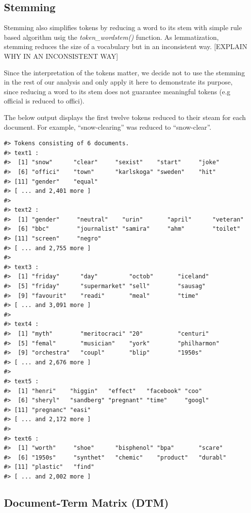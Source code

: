 \documentclass[
]{article}
\begin{document}
\hypertarget{stemming}{%
\subsection{Stemming}\label{stemming}}

Stemming also simplifies tokens by reducing a word to its stem with
simple rule based algorithm usig the \emph{token\_wordstem()} function.
As lemmatization, stemming reduces the size of a vocabulary but in an
inconsistent way. {[}EXPLAIN WHY IN AN INCONSISTENT WAY{]}

Since the interpretation of the tokens matter, we decide not to use the
stemming in the rest of our analysis and only apply it here to
demonstrate its purpose, since reducing a word to its stem does not
guarantee meaningful tokens (e.g official is reduced to offici).

The below output displays the first twelve tokens reduced to their steam
for each document. For example, ``snow-clearing'' was reduced to
``snow-clear''.

\begin{verbatim}
#> Tokens consisting of 6 documents.
#> text1 :
#>  [1] "snow"      "clear"     "sexist"    "start"     "joke"     
#>  [6] "offici"    "town"      "karlskoga" "sweden"    "hit"      
#> [11] "gender"    "equal"    
#> [ ... and 2,401 more ]
#> 
#> text2 :
#>  [1] "gender"     "neutral"    "urin"       "april"      "veteran"   
#>  [6] "bbc"        "journalist" "samira"     "ahm"        "toilet"    
#> [11] "screen"     "negro"     
#> [ ... and 2,755 more ]
#> 
#> text3 :
#>  [1] "friday"      "day"         "octob"       "iceland"    
#>  [5] "friday"      "supermarket" "sell"        "sausag"     
#>  [9] "favourit"    "readi"       "meal"        "time"       
#> [ ... and 3,091 more ]
#> 
#> text4 :
#>  [1] "myth"        "meritocraci" "20"          "centuri"    
#>  [5] "femal"       "musician"    "york"        "philharmon" 
#>  [9] "orchestra"   "coupl"       "blip"        "1950s"      
#> [ ... and 2,676 more ]
#> 
#> text5 :
#>  [1] "henri"    "higgin"   "effect"   "facebook" "coo"     
#>  [6] "sheryl"   "sandberg" "pregnant" "time"     "googl"   
#> [11] "pregnanc" "easi"    
#> [ ... and 2,172 more ]
#> 
#> text6 :
#>  [1] "worth"     "shoe"      "bisphenol" "bpa"       "scare"    
#>  [6] "1950s"     "synthet"   "chemic"    "product"   "durabl"   
#> [11] "plastic"   "find"     
#> [ ... and 2,002 more ]
\end{verbatim}

\hypertarget{document-term-matrix-dtm}{%
\subsection{Document-Term Matrix (DTM)}\label{document-term-matrix-dtm}}
\end{document}
